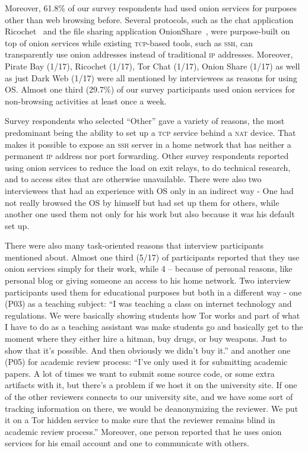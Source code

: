 Moreover, 61.8\% of our survey respondents had used onion services for purposes
other than web browsing before.  Several protocols, such as the chat application
Ricochet~\cite{ricochet} and the file sharing application
OnionShare~\cite{onionshare}, were purpose-built on top of onion services while
existing \textsc{tcp}-based tools, such as \textsc{ssh}, can transparently use
onion addresses instead of traditional \textsc{ip} addresses.  Moreover, Pirate Bay (1/17), Ricochet (1/17), Tor Chat (1/17), Onion Share (1/17) as well as just Dark Web (1/17) were all mentioned by interviewees as reasons for using OS.
Almost one third
(29.7\%) of our survey participants used onion services for non-browsing activities at
least once a week. 

Survey respondents who selected ``Other'' gave a variety of reasons, the most
predominant being the ability to set up a \textsc{tcp} service behind a
\textsc{nat} device.  That makes it possible to expose an \textsc{ssh} server in
a home network that has neither a permanent \textsc{ip} address nor port
forwarding.  Other survey respondents reported using onion services to reduce the load on exit relays, to do
technical research, and to access sites that are otherwise unavailable. There were also two interviewees that had an experience with OS only in an indirect way - One had not really browsed the OS by himself but had set up them for others, while another one used them not only for his work but also because it was his default set up.


There were also many task-oriented reasons that interview participants mentioned about. Almost one third (5/17) of participants reported that they use onion services simply for their work, while 4 – because of personal reasons, like personal blog or giving someone an access to his home network. Two interview participants used them for educational purposes but both in a different way - one (P03) as a teaching subject: “I was teaching a class on internet technology and regulations. We were basically showing students how Tor works and part of what I have to do as a teaching assistant was make students go and basically get to the moment where they either hire a hitman, buy drugs, or buy weapons. Just to show that it's possible. And then obviously we didn't buy it.” and another one (P05) for academic review process: “I've only used it for submitting academic papers. A lot of times we want to submit some source code, or some extra artifacts with it, but there's a problem if we host it on the university site. If one of the other reviewers connects to our university site, and we have some sort of tracking information on there, we would be deanonymizing the reviewer. We put it on a Tor hidden service to make sure that the reviewer remains blind in academic review process.” Moreover, one person reported that he uses onion services for his email account and one to communicate with others.

